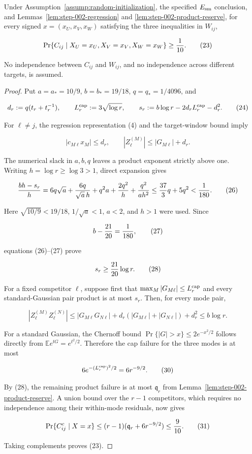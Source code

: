 \begin{proposition}\label{prop:step-002-conditional-competitors}
Under Assumption~\ref{assump:random-initialization}, the specified $E_{\rm sm}$ conclusion, and Lemmas~\ref{lem:step-002-regression} and
\ref{lem:step-002-product-reserve}, for every signed
$x=(x_U,x_V,x_W)$ satisfying the three inequalities in $W_{ij}$,

\[
\Pr\{C_{ij}\mid X_U=x_U,X_V=x_V,X_W=x_W\}\ge {1\over10}.
\tag{23}
\]

No independence between $C_{ij}$ and $W_{ij}$, and no independence across
different targets, is assumed.

\begin{proof}
Put $a=a_*=10/9$, $b=b_*=19/18$, $q=q_*=1/4096$, and

\[
d_r:=q(t_r+t_r^{-1}),\qquad
L_r^{\rm cap}:=3\sqrt{\log r},\qquad
s_r:=b\log r-2d_rL_r^{\rm cap}-d_r^2.
\tag{24}
\]

For $\ell\ne j$, the regression representation (4) and the target-window
bound imply

\[
|c_{M\ell}x_M|\le d_r,\qquad
|Z_{\ell}^{(M)}|\le |G_{M\ell}|+d_r.
\tag{25}
\]

The numerical slack in $a,b,q$ leaves a product exponent strictly above one.
Writing $h=\log r\ge\log3>1$, direct expansion gives

\[
{b h-s_r\over h}
=6q\sqrt a+{6q\over\sqrt a\,h}
+q^2a+{2q^2\over h}+{q^2\over a h^2}
\le {37\over3}q+5q^2<{1\over180}.
\tag{26}
\]

Here $\sqrt{10/9}<19/18$, $1/\sqrt a<1$, $a<2$, and $h>1$ were
used. Since

\[
b-{21\over20}={1\over180},
\tag{27}
\]

equations (26)--(27) prove

\[
s_r\ge {21\over20}\log r.
\tag{28}
\]

For a fixed competitor $\ell$, suppose first that
$\max_M|G_{M\ell}|\le L_r^{\rm cap}$ and every standard-Gaussian pair
product is at most $s_r$. Then, for every mode pair,

\[
|Z_{\ell}^{(M)}Z_{\ell}^{(N)}|
\le |G_{M\ell}G_{N\ell}|
+d_r(|G_{M\ell}|+|G_{N\ell}|)+d_r^2
\le b\log r.
\tag{29}
\]

For a standard Gaussian, the Chernoff bound
$\Pr\{|G|>x\}\le2e^{-x^2/2}$ follows directly from
$\mathbb Ee^{tG}=e^{t^2/2}$. Therefore the cap failure for the three
modes is at most

\[
6e^{-(L_r^{\rm cap})^2/2}=6r^{-9/2}.
\tag{30}
\]

By (28), the remaining product failure is at most $\mathfrak q_r$ from
Lemma~\ref{lem:step-002-product-reserve}. A union bound over the $r-1$
competitors, which requires no independence among their within-mode
residuals, now gives

\[
\Pr\{C_{ij}^c\mid X=x\}
\le(r-1)(\mathfrak q_r+6r^{-9/2})
\le {9\over10}.
\tag{31}
\]

Taking complements proves (23). 


\end{proof}
\end{proposition}
